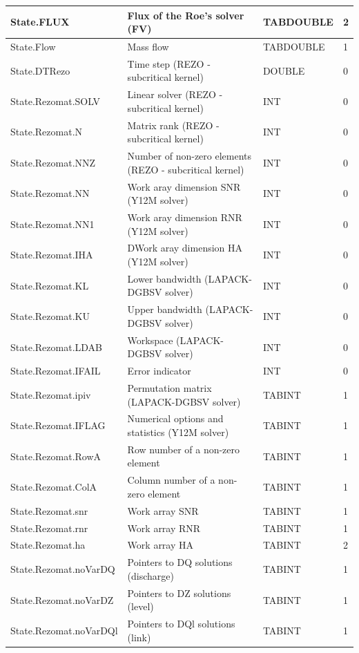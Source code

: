 \documentclass[a4paper,11pt]{article}
\begin{document}
\begin{landscape}
\begin{table}[ht]
\begin{center}
\begin{tabular}{|l|l|l|l|}
\hline  State.FLUX & Flux of the Roe's solver (FV) & TABDOUBLE & 2 \\
\hline  State.Flow & Mass flow & TABDOUBLE & 1 \\
\hline  State.DTRezo & Time step (REZO - subcritical kernel) & DOUBLE & 0 \\
\hline  State.Rezomat.SOLV & Linear solver (REZO - subcritical kernel) & INT & 0 \\
\hline  State.Rezomat.N & Matrix rank (REZO - subcritical kernel) & INT & 0 \\
\hline  State.Rezomat.NNZ & Number of non-zero elements (REZO - subcritical kernel) & INT & 0 \\
\hline  State.Rezomat.NN & Work aray dimension SNR (Y12M solver) & INT & 0 \\
\hline  State.Rezomat.NN1 & Work aray dimension RNR (Y12M solver) & INT & 0 \\
\hline  State.Rezomat.IHA & DWork aray dimension HA (Y12M solver) & INT & 0 \\
\hline  State.Rezomat.KL & Lower bandwidth (LAPACK-DGBSV solver) & INT & 0 \\
\hline  State.Rezomat.KU & Upper bandwidth (LAPACK-DGBSV solver) & INT & 0 \\
\hline  State.Rezomat.LDAB & Workspace (LAPACK-DGBSV solver) & INT & 0 \\
\hline  State.Rezomat.IFAIL & Error indicator & INT & 0 \\
\hline  State.Rezomat.ipiv & Permutation matrix (LAPACK-DGBSV solver) & TABINT & 1 \\
\hline  State.Rezomat.IFLAG & Numerical options and statistics (Y12M solver) & TABINT & 1 \\
\hline  State.Rezomat.RowA & Row number of a non-zero element & TABINT & 1 \\
\hline  State.Rezomat.ColA & Column number of a  non-zero element & TABINT & 1 \\
\hline  State.Rezomat.snr & Work array SNR & TABINT & 1 \\
\hline  State.Rezomat.rnr & Work array RNR & TABINT & 1 \\
\hline  State.Rezomat.ha & Work array HA & TABINT & 2 \\
\hline  State.Rezomat.noVarDQ & Pointers to DQ solutions (discharge) & TABINT & 1 \\
\hline  State.Rezomat.noVarDZ & Pointers to DZ solutions (level) & TABINT & 1 \\
\hline  State.Rezomat.noVarDQl & Pointers to DQl solutions (link) & TABINT & 1 \\

\end{tabular}
\end{center}
\end{table}
\end{landscape}
\end{document}
